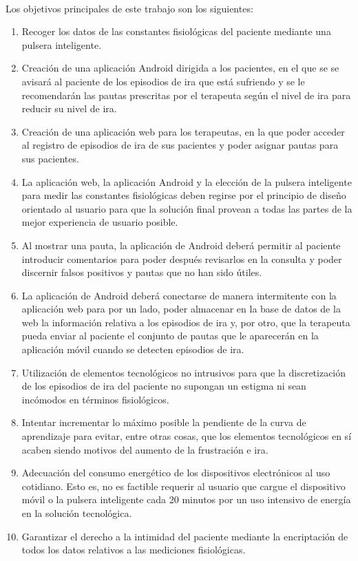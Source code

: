 \paragraph{}
Los objetivos principales de este trabajo son los siguientes:
\begin{enumerate}
    \item Recoger los datos de las constantes fisiológicas del paciente mediante una pulsera inteligente.
    \item Creación de una aplicación Android dirigida a los pacientes, en el que se se avisará al paciente de los episodios de ira que está sufriendo y se le recomendarán las pautas prescritas por el terapeuta según el nivel de ira para reducir su nivel de ira.
    \item Creación de una aplicación web para los terapeutas, en la que poder acceder al registro de episodios de ira de sus pacientes y poder asignar pautas para sus pacientes.
    \item La aplicación web, la aplicación Android y la elección de la pulsera inteligente para medir las constantes fisiológicas deben regirse por el principio de diseño orientado al usuario para que la solución final provean a todas las partes de la mejor experiencia de usuario posible.
    \item Al mostrar una pauta, la aplicación de Android deberá permitir al paciente introducir comentarios para poder después revisarlos en la consulta y poder discernir falsos positivos y pautas que no han sido útiles.
    \item La aplicación de Android deberá conectarse de manera intermitente con la aplicación web para por un lado, poder almacenar en la base de datos de la web la información relativa a los episodios de ira y, por otro, que la terapeuta pueda enviar al paciente el conjunto de pautas que le aparecerán en la aplicación móvil cuando se detecten episodios de ira.
    \item Utilización de elementos tecnológicos no intrusivos para que la discretización de los episodios de ira del paciente no supongan un estigma ni sean incómodos en términos fisiológicos.
    \item Intentar incrementar lo máximo posible la pendiente de la curva de aprendizaje para evitar, entre otras cosas, que los elementos tecnológicos en sí acaben siendo motivos del aumento de la frustración e ira.
    \item Adecuación del consumo energético de los dispositivos electrónicos al uso cotidiano. Esto es, no es factible requerir al usuario que cargue el dispositivo móvil o la pulsera inteligente cada 20 minutos por un uso intensivo de energía en la solución tecnológica.
    \item Garantizar el derecho a la intimidad del paciente mediante la encriptación de todos los datos relativos a las mediciones fisiológicas.
\end{enumerate}


